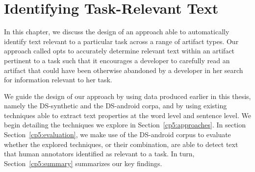 \setcounter{chapter}{4}
\setcounter{rq}{1}


\chapter{Identifying Task-Relevant Text}
\label{ch:identifying}


    
    



In this chapter, we discuss the design 
of an approach able to automatically
identify text relevant to a particular task across a range of artifact types.
Our approach called  opts to accurately determine relevant text within an artifact pertinent to a task such that it encourages a developer to carefully read an artifact that could have been otherwise abandoned by a developer in her search for information relevant to her task.


We guide the design of our approach by using data produced earlier in this thesis, namely the \acs{DS-synthetic} and the \acs{DS-android} corpa, and by using existing techniques 
able to extract text properties at the word level and sentence level. 
We begin detailing the techniques
we explore in Section~\ref{cp5:approaches}. 
In section Section~\ref{cp5:evaluation}, 
we make use of the \acs{DS-android} corpus
to evaluate whether the explored techniques, or their combination, 
are able to detect text that human annotators identified 
as relevant to a task. 
In turn, Section~\ref{cp5:summary} summarizes our key findings.




\clearpage














